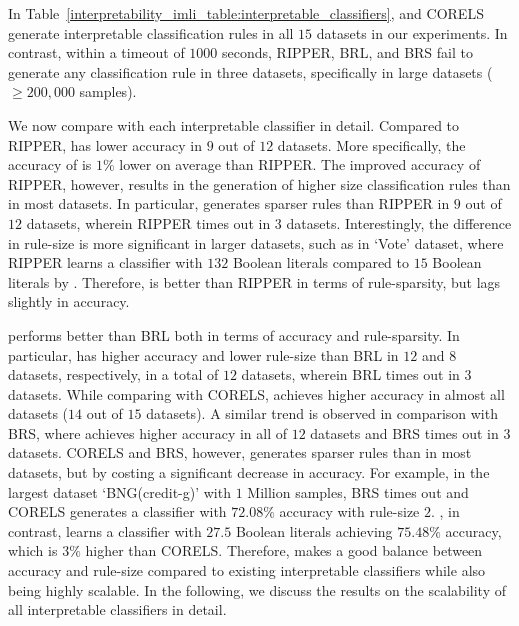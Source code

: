 In Table~\ref{interpretability_imli_table:interpretable_classifiers}, {\imli} and CORELS generate interpretable classification rules in all $ 15 $ datasets in our experiments. In contrast, within a timeout of $ 1000 $ seconds, RIPPER, BRL, and BRS fail to generate any classification rule in three datasets,  specifically in large datasets ($ \ge 200,000 $ samples). 



We now compare {\imli} with each interpretable classifier in detail. Compared to RIPPER, {\imli} has lower accuracy in $ 9 $ out  of $ 12 $ datasets. More specifically, the accuracy of {\imli} is $ 1\% $ lower on average than RIPPER. The improved accuracy of RIPPER, however, results in the generation of higher size classification rules than {\imli} in most datasets. In particular, {\imli} generates sparser rules than RIPPER in $ 9 $ out of $ 12 $ datasets, wherein RIPPER times out in $ 3 $ datasets. Interestingly, the difference in rule-size is more significant in larger datasets, such as in `Vote' dataset, where RIPPER learns a classifier with $ 132 $ Boolean literals compared to $ 15 $ Boolean literals by {\imli}.  Therefore, {\imli} is better than RIPPER in terms of rule-sparsity, but lags slightly in accuracy.


{\imli} performs better than BRL both in terms of accuracy and rule-sparsity. In particular, {\imli} has  higher accuracy and lower rule-size than BRL in $ 12 $ and $ 8 $ datasets, respectively, in a total of $ 12 $ datasets, wherein BRL times out in $ 3 $ datasets.  While comparing with CORELS, {\imli} achieves higher accuracy in almost all datasets ($ 14 $ out of $ 15 $ datasets). A similar trend is observed in comparison with BRS, where {\imli} achieves higher accuracy in all of $ 12 $ datasets and BRS times out in $ 3 $ datasets. CORELS and BRS, however, generates sparser rules than {\imli} in most datasets, but by costing a significant decrease in accuracy.  For example, in the largest dataset `BNG(credit-g)' with $ 1 $ Million samples, BRS times out and CORELS generates a classifier with  $ 72.08\% $ accuracy with rule-size $ 2 $. {\imli}, in contrast, learns a classifier with $ 27.5 $ Boolean literals achieving $ 75.48\% $ accuracy, which is $ 3\% $ higher than CORELS. Therefore, {\imli}  makes a good balance between accuracy and rule-size compared to existing interpretable classifiers while also being highly scalable. In the following, we discuss the results on the scalability of all interpretable classifiers in detail. 



